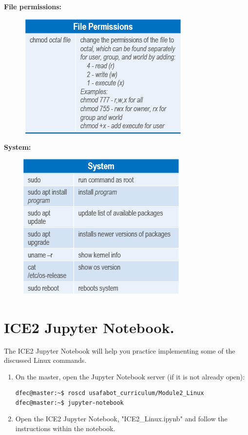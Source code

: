 \documentclass{handout}
\begin{document}
\textbf{File permissions:}

\begin{figure}[H]
	\flushleft
	\includegraphics[width=.5\textwidth]{filepermissions.PNG}
\end{figure}


\textbf{System:} 

\begin{figure}[H]
	\flushleft
	\includegraphics[width=.5\textwidth]{system.PNG}
\end{figure}


\section{ICE2 Jupyter Notebook.}
The ICE2 Jupyter Notebook will help you practice implementing some of the discussed Linux commands.

\begin{enumerate}\setlength\itemsep{1em}
	\item On the master, open the Jupyter Notebook server (if it is not already open):
	
\begin{lstlisting}[language=bash]
dfec@master:~$ roscd usafabot_curriculum/Module2_Linux
dfec@master:~$ jupyter-notebook
\end{lstlisting}
	
	\item Open the ICE2 Jupyter Notebook, "ICE2\_Linux.ipynb" and follow the instructions within the notebook. 
\end{enumerate}
\end{document}
